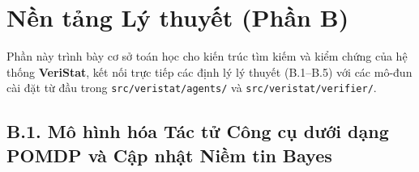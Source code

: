 \section{Nền tảng Lý thuyết (Phần B)}
\label{sec:part-b}

Phần này trình bày cơ sở toán học cho kiến trúc tìm kiếm và kiểm chứng của hệ thống \textbf{VeriStat}, kết nối trực tiếp các định lý lý thuyết (B.1--B.5) với các mô-đun cài đặt từ đầu trong \texttt{src/veristat/agents/} và \texttt{src/veristat/verifier/}.

\subsection{B.1. Mô hình hóa Tác tử Công cụ dưới dạng POMDP và Cập nhật Niềm tin Bayes}
\label{subsec:b1-pomdp}

